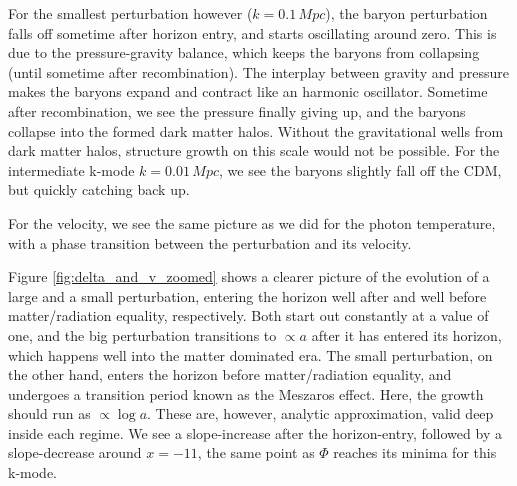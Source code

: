 \documentclass[10pt, a4paper]{article}
\begin{document}
For the smallest perturbation however ($k=0.1\, Mpc$), the baryon perturbation falls off sometime after horizon entry, and starts oscillating around zero. This is due to the pressure-gravity balance, which keeps the baryons from collapsing (until sometime after recombination). The interplay between gravity and pressure makes the baryons expand and contract like an harmonic oscillator. Sometime after recombination, we see the pressure finally giving up, and the baryons collapse into the formed dark matter halos. Without the gravitational wells from dark matter halos, structure growth on this scale would not be possible. For the intermediate k-mode $k=0.01\, Mpc$, we see the baryons slightly fall off the CDM, but quickly catching back up.

For the velocity, we see the same picture as we did for the photon temperature, with a phase transition between the perturbation and its velocity.

Figure \ref{fig:delta_and_v_zoomed} shows a clearer picture of the evolution of a large and a small perturbation, entering the horizon well after and well before matter/radiation equality, respectively. Both start out constantly at a value of one, and the big perturbation transitions to $\propto a$ after it has entered its horizon, which happens well into the matter dominated era. The small perturbation, on the other hand, enters the horizon before matter/radiation equality, and undergoes a transition period known as the Meszaros effect. Here, the growth should run as $\propto \log{a}$. These are, however, analytic approximation, valid deep inside each regime. We see a slope-increase after the horizon-entry, followed by a slope-decrease around $x=-11$, the same point as $\Phi$ reaches its minima for this k-mode.
\end{document}
